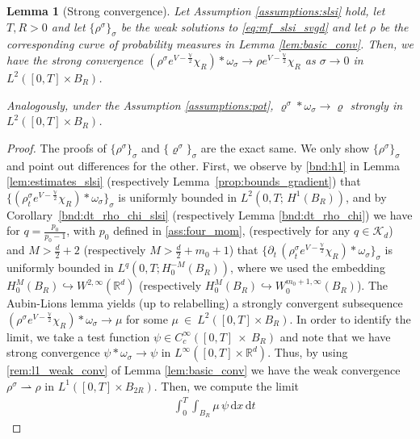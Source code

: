 \documentclass[reqno, 11pt]{amsart}
\numberwithin{equation}{section}
\newtheorem{lem}[thm]{Lemma}
\theoremstyle{definition}
\begin{document}
\begin{lem}[Strong convergence]\label{conv:rho_slsi}
    Let Assumption \ref{assumptions:slsi} hold, let $T,R>0$ and let $\{\rho^\sigma\}_\sigma$ be the weak solutions to \eqref{eq:mf_slsi_svgd} and let $\rho$ be the corresponding curve of probability measures in Lemma \ref{lem:basic_conv}. Then, we have the strong convergence $(\rho^\sigma e^{V-\frac{\mathbb{V}}{2}}\chi_R)\ast\omega_\sigma\rightarrow \rho e^{V-\frac{\mathbb{V}}{2}}\chi_R$ as $\sigma\rightarrow 0$ in $L^2([0,T]\times B_R)$.
    
    \smallskip
    
    Analogously, under the Assumption \ref{assumptions:pot}, $\varrho^\sigma\ast\omega_\sigma \to \varrho$ strongly in $L^2([0,T]\times B_R)$.
\end{lem}
\begin{proof}
    The proofs of $\{\rho^\sigma\}_\sigma$ and $\{\varrho^\sigma\}_\sigma$ are the exact same. We only show $\{\rho^\sigma\}_\sigma$ and point out differences for the other. First, we observe by \ref{bnd:h1} in Lemma \ref{lem:estimates_slsi} (respectively Lemma~\ref{prop:bounds_gradient}) that $\{(\rho_t^\sigma e^{V-\frac{\mathbb{V}}{2}}\chi_R)\ast\omega_\sigma\}_\sigma$ is uniformly bounded in $L^2(0,T;\, H^1(B_R))$, and by Corollary~\ref{bnd:dt_rho_chi_slsi} (respectively Lemma \ref{bnd:dt_rho_chi}) we have for $q=\frac{p_0}{p_0-1}$, with $p_0$ defined in \ref{ass:four_mom}, (respectively for any $q\in \mathcal{K}_d$) and $M>\frac{d}{2}+2$ (respectively $M>\frac{d}{2}+m_0+1$) that $\{\partial_t\,(\rho_t^\sigma e^{V-\frac{\mathbb{V}}{2}}\chi_R)\ast\omega_\sigma\}_\sigma$ is uniformly bounded in $L^q(0,T; H_0^{-M}(B_R))$, where we used the embedding $H_0^{M}(B_R)\hookrightarrow W^{2,\infty}(\mathbb{R}^{d})$ (respectively $H_0^{M}(B_R)\hookrightarrow W_0^{m_0+1,\infty}(B_R)$). The Aubin-Lions lemma yields (up to relabelling) a strongly convergent subsequence $(\rho^\sigma e^{V-\frac{\mathbb{V}}{2}}\chi_R)\ast\omega_\sigma\rightarrow \mu$ for some $\mu~\in~L^2([0,T]\times B_R)$. In order to identify the limit, we take a test function $\psi\in C_c^\infty([0,T]~\times~B_R)$ and note that we have strong convergence $\psi\ast\omega_\sigma\rightarrow \psi$ in $L^\infty([0,T]\times \mathbb{R}^{d})$. Thus, by using \ref{rem:l1_weak_conv} of Lemma \ref{lem:basic_conv} we have the weak convergence $\rho^\sigma\rightharpoonup\rho$ in $L^1([0,T]\times B_{2R})$. Then, we compute the limit
    \begin{align*}
        &\int_0^T\int_{B_R} \mu\, \psi\,\mathrm{d} x\,\mathrm{d} t

\end{align*}
\end{proof}
\end{document}

